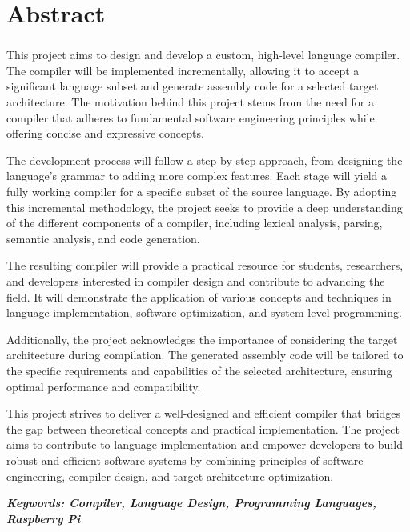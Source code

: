 \chapter*{Abstract} 
\subsection*{\thesistitle}
\vspace{5mm}

This project aims to design and develop a custom, high-level language compiler. The compiler will be implemented incrementally, allowing it to accept a significant language subset and generate assembly code for a selected target architecture. The motivation behind this project stems from the need for a compiler that adheres to fundamental software engineering principles while offering concise and expressive concepts.

The development process will follow a step-by-step approach, from designing the language's grammar to adding more complex features. Each stage will yield a fully working compiler for a specific subset of the source language. By adopting this incremental methodology, the project seeks to provide a deep understanding of the different components of a compiler, including lexical analysis, parsing, semantic analysis, and code generation.

The resulting compiler will provide a practical resource for students, researchers, and developers interested in compiler design and contribute to advancing the field. It will demonstrate the application of various concepts and techniques in language implementation, software optimization, and system-level programming.

Additionally, the project acknowledges the importance of considering the target architecture during compilation. The generated assembly code will be tailored to the specific requirements and capabilities of the selected architecture, ensuring optimal performance and compatibility.

This project strives to deliver a well-designed and efficient compiler that bridges the gap between theoretical concepts and practical implementation. The project aims to contribute to language implementation and empower developers to build robust and efficient software systems by combining principles of software engineering, compiler design, and target architecture optimization.

\vspace{2em}
\emph{\textbf{Keywords: Compiler, Language Design, Programming Languages, Raspberry Pi}}